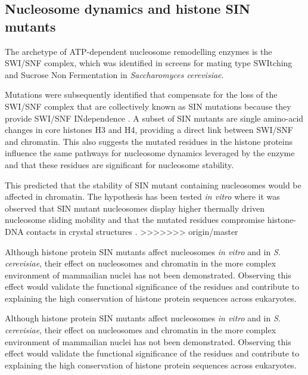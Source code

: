   \subsection{Nucleosome dynamics and histone SIN mutants}

    The archetype of ATP-dependent nucleosome remodelling enzymes is
    the SWI/SNF complex, which was identified in screens for mating
    type SWItching \citep{SWI-mutants} and Sucrose Non Fermentation
    \citep{SNF-mutants-original-discovery, SNF-mutants2} in
    \textit{Saccharomyces cerevisiae}.

    Mutations were subsequently identified that compensate for the
    loss of the SWI/SNF complex that are collectively known as SIN
    mutations because they provide SWI/SNF INdependence
    .  A subset of SIN mutants are single
    amino-acid changes in core histones H3 and H4, providing a direct
    link between SWI/SNF and chromatin.  This also suggests the
    mutated residues in the histone proteins influence the same
    pathways for nucleosome dynamics leveraged by the enzyme and that
    these residues are significant for nucleosome stability.

    This predicted that the stability of SIN mutant containing
    nucleosomes would be affected in chromatin.
    The hypothesis has been tested \textit{in vitro}
    where it was observed that SIN mutant nucleosomes display higher 
    thermally driven nucleosome sliding mobility \citep{flaus2004sin}
    and that the mutated residues compromise histone-DNA contacts in
    crystal structures \citep{muthurajan2004crystal}.
>>>>>>> origin/master

    Although histone protein SIN mutants affect nucleosomes \textit{in vitro} and in \textit{S. cerevisiae},
    their effect on nucleosomes and chromatin in the more complex environment 
    of mammailian nuclei has not been demonstrated.
    Observing this effect would validate the functional significance of the residues
    and contribute to explaining the high conservation of histone protein sequences across eukaryotes.

    Although histone protein SIN mutants affect nucleosomes \textit{in
      vitro} and in \textit{S. cerevisiae}, their effect on
    nucleosomes and chromatin in the more complex environment of
    mammailian nuclei has not been demonstrated.  Observing this
    effect would validate the functional significance of the residues
    and contribute to explaining the high conservation of histone
    protein sequences across eukaryotes.

